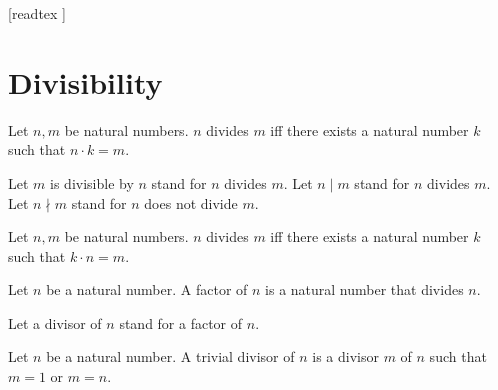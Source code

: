 \documentclass[10pt]{article}
\begin{document}
  \begin{imports}
    \begin{forthel}
      [readtex ]
    \end{forthel}
  \end{imports}


  \section*{Divisibility}

  \begin{forthel}
    \begin{definition}
      Let $n, m$ be natural numbers.
      $n$ divides $m$ iff there exists a natural number $k$ such that $n \cdot k = m$.
    \end{definition}

    Let $m$ is divisible by $n$ stand for $n$ divides $m$.
    Let $n \mid m$ stand for $n$ divides $m$.
    Let $n \nmid m$ stand for $n$ does not divide $m$.
  \end{forthel}

  \begin{forthel}
    \begin{lemma}
      Let $n, m$ be natural numbers.
      $n$ divides $m$ iff there exists a natural number $k$ such that $k \cdot n = m$.
    \end{lemma}
  \end{forthel}

  \begin{forthel}
    \begin{definition}
      Let $n$ be a natural number.
      A factor of $n$ is a natural number that divides $n$.
    \end{definition}

    Let a divisor of $n$ stand for a factor of $n$.
  \end{forthel}

  \begin{forthel}
    \begin{definition}
      Let $n$ be a natural number.
      A trivial divisor of $n$ is a divisor $m$ of $n$ such that $m = 1$ or $m = n$.
    \end{definition}
  \end{forthel}
\end{document}
